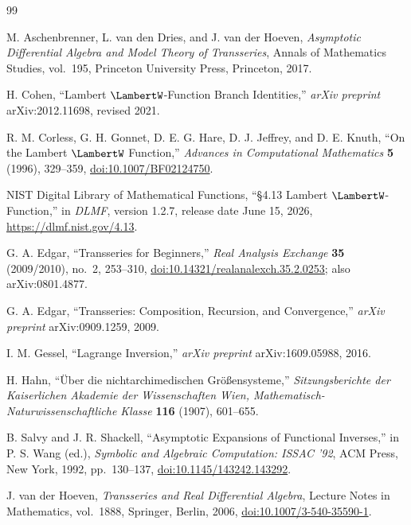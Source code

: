 \documentclass[11pt,oneside]{article}
\numberwithin{equation}{section}
\theoremstyle{definition}
\begin{document}
\clearpage
\begin{thebibliography}{99}

M. Aschenbrenner, L. van den Dries, and J. van der Hoeven,
\emph{Asymptotic Differential Algebra and Model Theory of Transseries},
Annals of Mathematics Studies, vol.~195, Princeton University Press,
Princeton, 2017.

H. Cohen,
``Lambert \(\LambertW\)-Function Branch Identities,''
\emph{arXiv preprint} arXiv:2012.11698, revised 2021.

R. M. Corless, G. H. Gonnet, D. E. G. Hare, D. J. Jeffrey, and D. E. Knuth,
``On the Lambert \(\LambertW\) Function,''
\emph{Advances in Computational Mathematics} \textbf{5} (1996), 329--359,
\href{https://doi.org/10.1007/BF02124750}{doi:10.1007/BF02124750}.

NIST Digital Library of Mathematical Functions,
``\S4.13 Lambert \(\LambertW\)-Function,'' in \emph{DLMF}, version 1.2.7,
release date June 15, 2026,
\url{https://dlmf.nist.gov/4.13}.

G. A. Edgar,
``Transseries for Beginners,''
\emph{Real Analysis Exchange} \textbf{35} (2009/2010), no.~2, 253--310,
\href{https://doi.org/10.14321/realanalexch.35.2.0253}{doi:10.14321/realanalexch.35.2.0253};
also arXiv:0801.4877.

G. A. Edgar,
``Transseries: Composition, Recursion, and Convergence,''
\emph{arXiv preprint} arXiv:0909.1259, 2009.

I. M. Gessel,
``Lagrange Inversion,''
\emph{arXiv preprint} arXiv:1609.05988, 2016.

H. Hahn,
``\"Uber die nichtarchimedischen Gr\"o\ss ensysteme,''
\emph{Sitzungsberichte der Kaiserlichen Akademie der Wissenschaften Wien,
Mathematisch-Naturwissenschaftliche Klasse} \textbf{116} (1907), 601--655.

B. Salvy and J. R. Shackell,
``Asymptotic Expansions of Functional Inverses,''
in P. S. Wang (ed.), \emph{Symbolic and Algebraic Computation: ISSAC '92},
ACM Press, New York, 1992, pp.~130--137,
\href{https://doi.org/10.1145/143242.143292}{doi:10.1145/143242.143292}.

J. van der Hoeven,
\emph{Transseries and Real Differential Algebra},
Lecture Notes in Mathematics, vol.~1888, Springer, Berlin, 2006,
\href{https://doi.org/10.1007/3-540-35590-1}{doi:10.1007/3-540-35590-1}.

\end{thebibliography}
\end{document}
